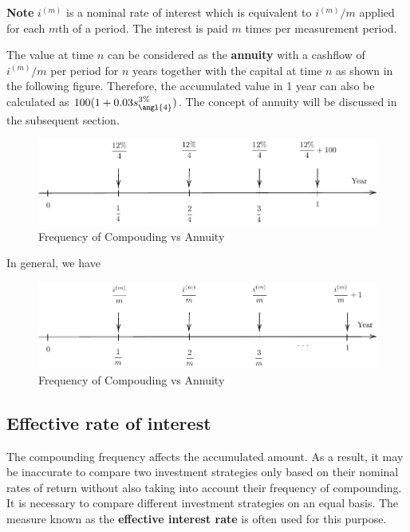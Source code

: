 \documentclass[landscape, 20pt]{extreport}
\theoremstyle{definition}
\theoremstyle{definition}
\theoremstyle{definition}
\theoremstyle{definition}
\theoremstyle{remark}
\begin{document}
\textbf{Note} \(i^{(m)}\) is a nominal rate of interest which is equivalent to \(i^{(m)}/m\) applied for
each \(m\)th of a period. The interest is paid \(m\) times per measurement period.

The value at time \(n\) can be considered as the \textbf{annuity} with a cashflow of \(i^{(m)}/m\) per period for \(n\) years together with the capital at time \(n\) as shown in the following figure.
Therefore, the accumulated value in 1 year can also be calculated as \(100( 1 + 0.03 s_{\angl{4}}^{3\%})\). The concept of annuity will be discussed in the subsequent section.

\begin{figure}

{\centering \includegraphics{tikz-ex5-1} 

}

\caption{Frequency of Compouding vs Annuity}\label{fig:tikz-ex5}
\end{figure}

In general, we have

\begin{figure}

{\centering \includegraphics{tikz-ex4-1} 

}

\caption{Frequency of Compouding vs Annuity}\label{fig:tikz-ex4}
\end{figure}

\hypertarget{effective-rate-of-interest}{%
\newpage \subsection{Effective rate of interest}\label{effective-rate-of-interest}}

The compounding frequency affects the accumulated amount. As a result, it may be inaccurate to compare two investment strategies only based on their nominal rates of return without also taking into account their frequency of compounding. It is necessary to compare different investment strategies on an equal basis. The measure known as the \textbf{effective interest rate} is often used for this purpose.
\end{document}
